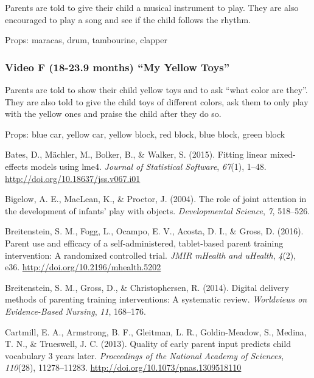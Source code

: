 \documentclass[]{article}
\begin{document}
Parents are told to give their child a musical instrument to play. They
are also encouraged to play a song and see if the child follows the
rhythm.

Props: maracas, drum, tambourine, clapper

\hypertarget{video-f-18-23.9-months-my-yellow-toys}{%
\subsubsection{Video F (18-23.9 months) ``My Yellow
Toys''}\label{video-f-18-23.9-months-my-yellow-toys}}

Parents are told to show their child yellow toys and to ask ``what color
are they''. They are also told to give the child toys of different
colors, ask them to only play with the yellow ones and praise the child
after they do so.

Props: blue car, yellow car, yellow block, red block, blue block, green
block

\hypertarget{refs}{}
\leavevmode\hypertarget{ref-lme4}{}%
Bates, D., Mächler, M., Bolker, B., \& Walker, S. (2015). Fitting linear
mixed-effects models using lme4. \emph{Journal of Statistical Software},
\emph{67}(1), 1--48. \url{http://doi.org/10.18637/jss.v067.i01}

\leavevmode\hypertarget{ref-Bigelow2004}{}%
Bigelow, A. E., MacLean, K., \& Proctor, J. (2004). The role of joint
attention in the development of infants' play with objects.
\emph{Developmental Science}, \emph{7}, 518--526.

\leavevmode\hypertarget{ref-Breitenstein2016}{}%
Breitenstein, S. M., Fogg, L., Ocampo, E. V., Acosta, D. I., \& Gross,
D. (2016). Parent use and efficacy of a self-administered, tablet-based
parent training intervention: A randomized controlled trial. \emph{JMIR
mHealth and uHealth}, \emph{4}(2), e36.
\url{http://doi.org/10.2196/mhealth.5202}

\leavevmode\hypertarget{ref-Breitenstein2014}{}%
Breitenstein, S. M., Gross, D., \& Christophersen, R. (2014). Digital
delivery methods of parenting training interventions: A systematic
review. \emph{Worldviews on Evidence-Based Nursing}, \emph{11},
168--176.

\leavevmode\hypertarget{ref-Cartmill2013}{}%
Cartmill, E. A., Armstrong, B. F., Gleitman, L. R., Goldin-Meadow, S.,
Medina, T. N., \& Trueswell, J. C. (2013). Quality of early parent input
predicts child vocabulary 3 years later. \emph{Proceedings of the
National Academy of Sciences}, \emph{110}(28), 11278--11283.
\url{http://doi.org/10.1073/pnas.1309518110}
\end{document}
